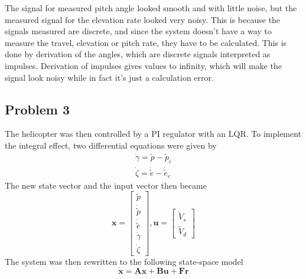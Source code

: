 \newline\newline
The signal for measured pitch angle looked smooth and with little noise, but the measured signal for the elevation rate looked very noisy. This is because the signals measured are discrete, and since the system doesn't have a way to measure the travel, elevation or pitch rate, they have to be calculated. This is done by derivation of the angles, which are discrete signals interpreted as impulses. Derivation of impulses gives values to infinity, which will make the signal look noisy while in fact it's just a calculation error.

\subsection{Problem 3}

The helicopter was then controlled by a PI regulator with an LQR. To implement the integral effect, two differential equations were given by 
\begin{subequations}
    \begin{gather}
       \dot{\gamma}= \tilde{p} - \tilde{p}_c\\
       \dot{\zeta} = \dot{\tilde{e}} - \dot{\tilde{e}}_c
    \end{gather}
\end{subequations}
The new state vector and the input vector then became 
\[
    \boldsymbol{x}=\begin{bmatrix}
    \tilde{p}\\
    \dot{\tilde{p}}\\
    \dot{\tilde{e}}\\
    \dot{\gamma}\\
    \dot{\zeta}
  \end{bmatrix},
\boldsymbol{u}= \begin{bmatrix}
   \tilde{V}_s\\
   \tilde{V}_d
\end{bmatrix}
\]
The system was then rewritten to the following state-space model
\begin{equation*}
    \boldsymbol{\dot{x} = Ax +Bu + Fr}
\end{equation*}


